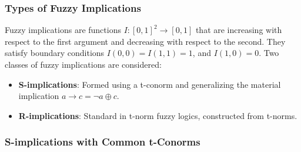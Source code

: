 \documentclass{beamer}
\begin{document}
\begin{frame}
\frametitle{Types of Fuzzy Implications}
Fuzzy implications are functions \( I: [0, 1]^2 \to [0, 1] \) that are increasing with respect to the first argument and decreasing with respect to the second. They satisfy boundary conditions \( I(0, 0) = I(1, 1) = 1 \), and \( I(1, 0) = 0 \). Two classes of fuzzy implications are considered:
\begin{itemize}
    \item \textbf{S-implications}: Formed using a t-conorm and generalizing the material implication \( a \to c = \neg a \oplus c \).
    \item \textbf{R-implications}: Standard in t-norm fuzzy logics, constructed from t-norms.
\end{itemize}
\end{frame}

\begin{frame}
\frametitle{S-implications with Common t-Conorms}
\end{frame}
\end{document}
